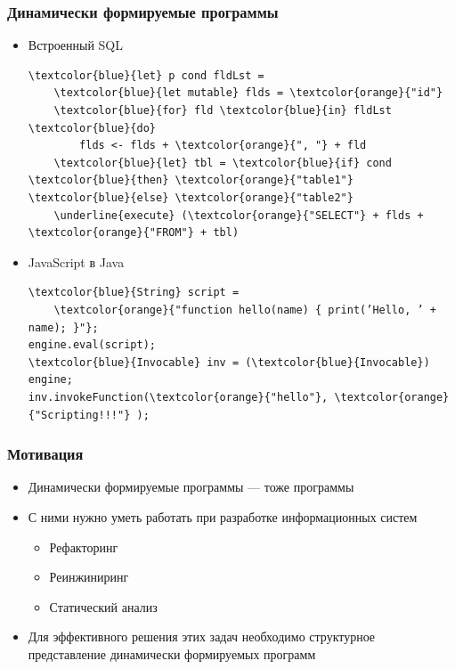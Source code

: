 \documentclass{beamer}
\begin{document}
\begin{frame}[fragile]
    \transwipe[direction=90]
    \frametitle{Динамически формируемые программы}
    \begin{itemize}
        \item Встроенный SQL
\begin{Verbatim}[commandchars=\\\{\}]
\textcolor{blue}{let} p cond fldLst =
    \textcolor{blue}{let mutable} flds = \textcolor{orange}{"id"}
    \textcolor{blue}{for} fld \textcolor{blue}{in} fldLst \textcolor{blue}{do}
        flds <- flds + \textcolor{orange}{", "} + fld 
    \textcolor{blue}{let} tbl = \textcolor{blue}{if} cond \textcolor{blue}{then} \textcolor{orange}{"table1"} \textcolor{blue}{else} \textcolor{orange}{"table2"}    
    \underline{execute} (\textcolor{orange}{"SELECT"} + flds + \textcolor{orange}{"FROM"} + tbl)
\end{Verbatim}
        \item JavaScript в Java
\begin{Verbatim}[commandchars=\\\{\}]
\textcolor{blue}{String} script =
    \textcolor{orange}{"function hello(name) { print(’Hello, ’ + name); }"};
engine.eval(script);
\textcolor{blue}{Invocable} inv = (\textcolor{blue}{Invocable}) engine;
inv.invokeFunction(\textcolor{orange}{"hello"}, \textcolor{orange}{"Scripting!!!"} );
\end{Verbatim}
    \end{itemize}

\end{frame}

\begin{frame}
    \transwipe[direction=90]
    \frametitle{Мотивация}
    \begin{itemize}
        \item Динамически формируемые программы --- тоже программы 
        \item С ними нужно уметь работать при разработке информационных систем
        \begin{itemize}
            \item Рефакторинг
            \item Реинжиниринг
            \item Статический анализ
        \end{itemize}
        \item Для эффективного решения этих задач необходимо структурное представление динамически формируемых программ
    \end{itemize}
\end{frame}
\end{document}
